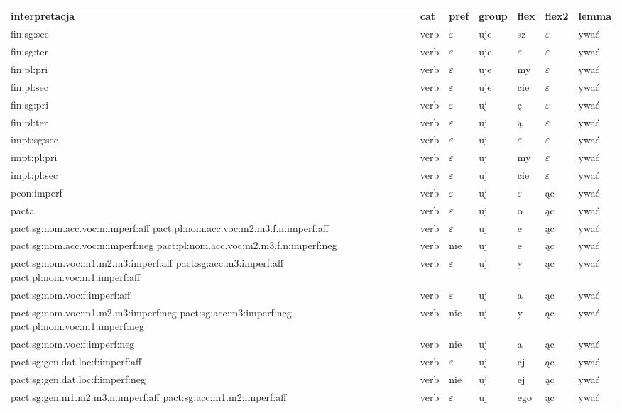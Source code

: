 \documentclass{article}
\begin{document}
\begin{longtable}{p{7cm}|l|l|l|l|l|l}
interpretacja & cat & pref & group & flex & flex2 & lemma\\
\hline
fin:sg:sec & verb & $\varepsilon$ & uje & sz & $\varepsilon$ & ywać\\
fin:sg:ter & verb & $\varepsilon$ & uje & $\varepsilon$ & $\varepsilon$ & ywać\\
fin:pl:pri & verb & $\varepsilon$ & uje & my & $\varepsilon$ & ywać\\
fin:pl:sec & verb & $\varepsilon$ & uje & cie & $\varepsilon$ & ywać\\
fin:sg:pri & verb & $\varepsilon$ & uj & ę & $\varepsilon$ & ywać\\
fin:pl:ter & verb & $\varepsilon$ & uj & ą & $\varepsilon$ & ywać\\
impt:sg:sec & verb & $\varepsilon$ & uj & $\varepsilon$ & $\varepsilon$ & ywać\\
impt:pl:pri & verb & $\varepsilon$ & uj & my & $\varepsilon$ & ywać\\
impt:pl:sec & verb & $\varepsilon$ & uj & cie & $\varepsilon$ & ywać\\
pcon:imperf & verb & $\varepsilon$ & uj & $\varepsilon$ & ąc & ywać\\
pacta & verb & $\varepsilon$ & uj & o & ąc & ywać\\
pact:sg:nom.acc.voc:n:imperf:aff pact:pl:nom.acc.voc:m2.m3.f.n:imperf:aff & verb & $\varepsilon$ & uj & e & ąc & ywać\\
pact:sg:nom.acc.voc:n:imperf:neg pact:pl:nom.acc.voc:m2.m3.f.n:imperf:neg & verb & nie & uj & e & ąc & ywać\\
pact:sg:nom.voc:m1.m2.m3:imperf:aff pact:sg:acc:m3:imperf:aff pact:pl:nom.voc:m1:imperf:aff & verb & $\varepsilon$ & uj & y & ąc & ywać\\
pact:sg:nom.voc:f:imperf:aff & verb & $\varepsilon$ & uj & a & ąc & ywać\\
pact:sg:nom.voc:m1.m2.m3:imperf:neg pact:sg:acc:m3:imperf:neg pact:pl:nom.voc:m1:imperf:neg & verb & nie & uj & y & ąc & ywać\\
pact:sg:nom.voc:f:imperf:neg & verb & nie & uj & a & ąc & ywać\\
pact:sg:gen.dat.loc:f:imperf:aff & verb & $\varepsilon$ & uj & ej & ąc & ywać\\
pact:sg:gen.dat.loc:f:imperf:neg & verb & nie & uj & ej & ąc & ywać\\
pact:sg:gen:m1.m2.m3.n:imperf:aff pact:sg:acc:m1.m2:imperf:aff & verb & $\varepsilon$ & uj & ego & ąc & ywać\\

\end{longtable}
\end{document}
